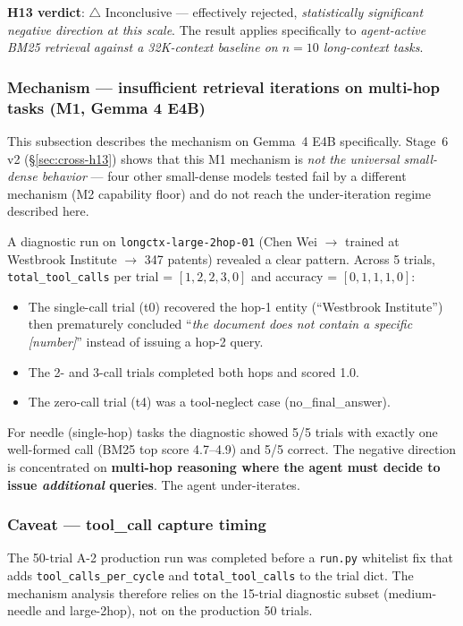 \documentclass[11pt]{article}
\newcommand{\code}[1]{\texttt{#1}}
\begin{document}
\textbf{H13 verdict}: $\triangle$ Inconclusive --- effectively rejected, \emph{statistically significant negative direction at this scale}. The result applies specifically to \emph{agent-active BM25 retrieval against a 32K-context baseline on $n\!=\!10$ long-context tasks}.

\subsubsection{Mechanism --- insufficient retrieval iterations on multi-hop tasks (M1, Gemma 4 E4B)}\label{sec:m1}

This subsection describes the mechanism on Gemma~4 E4B specifically. Stage~6 v2 (\S\ref{sec:cross-h13}) shows that this M1 mechanism is \emph{not the universal small-dense behavior} --- four other small-dense models tested fail by a different mechanism (M2 capability floor) and do not reach the under-iteration regime described here.

A diagnostic run on \code{longctx-large-2hop-01} (Chen Wei $\to$ trained at Westbrook Institute $\to$ 347 patents) revealed a clear pattern. Across 5 trials, \code{total\_tool\_calls} per trial = $[1, 2, 2, 3, 0]$ and accuracy = $[0, 1, 1, 1, 0]$:

\begin{itemize}[leftmargin=*]
\item The single-call trial (t0) recovered the hop-1 entity (``Westbrook Institute'') then prematurely concluded ``\emph{the document does not contain a specific [number]}'' instead of issuing a hop-2 query.
\item The 2- and 3-call trials completed both hops and scored 1.0.
\item The zero-call trial (t4) was a tool-neglect case (no\_final\_answer).
\end{itemize}

For needle (single-hop) tasks the diagnostic showed 5/5 trials with exactly one well-formed call (BM25 top score 4.7--4.9) and 5/5 correct. The negative direction is concentrated on \textbf{multi-hop reasoning where the agent must decide to issue \emph{additional} queries}. The agent under-iterates.

\subsubsection{Caveat --- tool\_call capture timing}
The 50-trial A-2 production run was completed before a \code{run.py} whitelist fix that adds \code{tool\_calls\_per\_cycle} and \code{total\_tool\_calls} to the trial dict. The mechanism analysis therefore relies on the 15-trial diagnostic subset (medium-needle and large-2hop), not on the production 50 trials.
\end{document}
